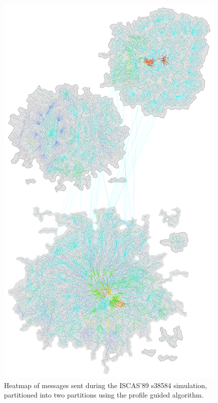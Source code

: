 \documentclass[11pt]{book}
\begin{document}
\begin{figure}
\centering
\includegraphics[width=\textwidth,height=0.9\textheight,keepaspectratio]{figs/s38584_2part}
\caption{Heatmap of messages sent during the ISCAS'89 s38584 simulation, partitioned into two partitions using the profile guided algorithm.}
\end{figure}
\end{document}
